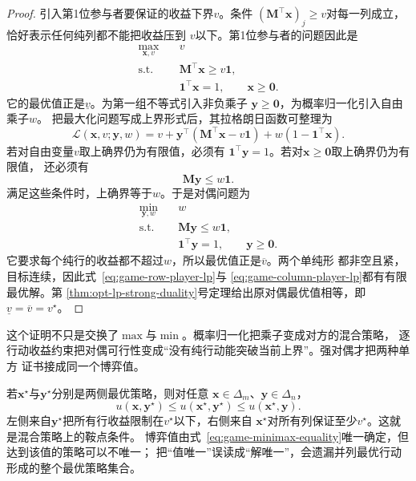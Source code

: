 \begin{proof}
引入第1位参与者要保证的收益下界\(v\)。条件
\((\bm{M}^{\top}\bm{x})_j\geq v\)对每一列成立，恰好表示任何纯列都不能把收益压到
\(v\)以下。第1位参与者的问题因此是
\begin{equation}
  \begin{aligned}
    \max_{\bm{x},v}\quad&v\\
    \text{s.t.}\quad&
      \bm{M}^{\top}\bm{x}\geq v\bm{1},\\
    &\bm{1}^{\top}\bm{x}=1,\qquad
      \bm{x}\geq\bm{0}.
  \end{aligned}
  \label{eq:game-row-player-lp}
\end{equation}
它的最优值正是\(\underline v\)。为第一组不等式引入非负乘子
\(\bm{y}\geq\bm{0}\)，为概率归一化引入自由乘子\(w\)。
把最大化问题写成上界形式后，其拉格朗日函数可整理为
\[
  \mathcal{L}(\bm{x},v;\bm{y},w)
  =
  v+\bm{y}^{\top}
  (\bm{M}^{\top}\bm{x}-v\bm{1})
  +w(1-\bm{1}^{\top}\bm{x}).
\]
若对自由变量\(v\)取上确界仍为有限值，必须有
\(\bm{1}^{\top}\bm{y}=1\)。若对\(\bm{x}\geq\bm{0}\)取上确界仍为有限值，
还必须有
\[
  \bm{M}\bm{y}\leq w\bm{1}.
\]
满足这些条件时，上确界等于\(w\)。于是对偶问题为
\begin{equation}
  \begin{aligned}
    \min_{\bm{y},w}\quad&w\\
    \text{s.t.}\quad&
      \bm{M}\bm{y}\leq w\bm{1},\\
    &\bm{1}^{\top}\bm{y}=1,\qquad
      \bm{y}\geq\bm{0}.
  \end{aligned}
  \label{eq:game-column-player-lp}
\end{equation}
它要求每个纯行的收益都不超过\(w\)，所以最优值正是\(\overline v\)。两个单纯形
都非空且紧，目标连续，因此式~\eqref{eq:game-row-player-lp}与
\eqref{eq:game-column-player-lp}都有有限最优解。第
\ref{thm:opt-lp-strong-duality}号定理给出原对偶最优值相等，即
\(\underline v=\overline v=v^\star\)。
\end{proof}

这个证明不只是交换了\(\max\)与\(\min\)。概率归一化把乘子变成对方的混合策略，
逐行动收益约束把对偶可行性变成“没有纯行动能突破当前上界”。强对偶才把两种单方
证书接成同一个博弈值。

若\(\bm{x}^\star\)与\(\bm{y}^\star\)分别是两侧最优策略，则对任意
\(\bm{x}\in\Delta_m\)、\(\bm{y}\in\Delta_n\)，
\begin{equation}
  u(\bm{x},\bm{y}^\star)
  \leq
  u(\bm{x}^\star,\bm{y}^\star)
  \leq
  u(\bm{x}^\star,\bm{y}).
  \label{eq:game-zero-sum-saddle}
\end{equation}
左侧来自\(\bm{y}^\star\)把所有行收益限制在\(v^\star\)以下，右侧来自
\(\bm{x}^\star\)对所有列保证至少\(v^\star\)。这就是混合策略上的鞍点条件。
博弈值由式~\eqref{eq:game-minimax-equality}唯一确定，但达到该值的策略可以不唯一；
把“值唯一”误读成“解唯一”，会遗漏并列最优行动形成的整个最优策略集合。


